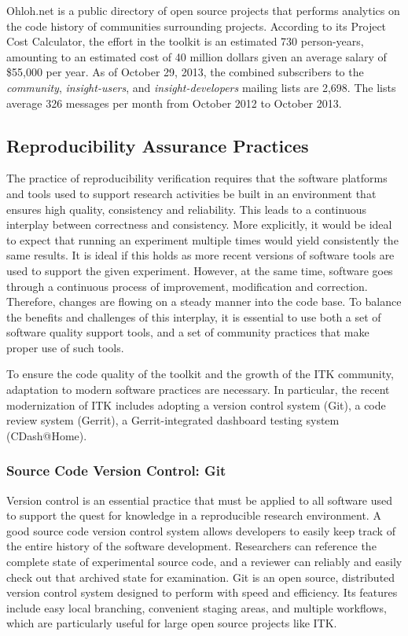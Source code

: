 \documentclass{frontiersENG} %
\begin{document}
Ohloh.net \cite{OhlohITK2013} is a public directory of open source projects
that performs analytics on the code history of communities surrounding
projects. According to its Project Cost Calculator, the effort in the toolkit
is an estimated 730 person-years, amounting to an estimated cost of 40 million
dollars given an average salary of \$55,000 per year.  As of October 29, 2013,
the combined subscribers to the \textit{community}, \textit{insight-users}, and
\textit{insight-developers} mailing lists are 2,698.  The lists average 326
messages per month from October 2012 to October 2013.


\subsection{Reproducibility Assurance Practices}
The practice of reproducibility verification requires that the software
platforms and tools used to support research activities be built in an
environment that ensures high quality, consistency and reliability. This
leads to a continuous interplay between correctness and consistency. More
explicitly, it would be ideal to expect that running an experiment multiple times
would yield consistently the same results. It is ideal if this holds as more
recent versions of software tools are used to support the given experiment.
However, at the same time, software goes through a continuous process of
improvement, modification and correction. Therefore, changes are flowing on a
steady manner into the code base. To balance the benefits and challenges of
this interplay, it is essential to use both a set of software quality support
tools, and a set of community practices that make proper use of such tools.

To ensure the code quality of the toolkit and the growth of the ITK community,
adaptation to modern software practices are necessary. In particular, the
recent modernization of ITK includes adopting a version control system (Git),
 a code review system (Gerrit), a Gerrit-integrated dashboard testing system
(CDash@Home).


\subsubsection{Source Code Version Control: Git}
Version control is an essential practice that must be applied to all software
used to support the quest for knowledge in a reproducible research environment.
A good source code version control system allows developers to easily keep
track of the entire history of the software development. Researchers can
reference the complete state of experimental source code, and a reviewer can
reliably and easily check out that archived state for examination.  Git is an
open source, distributed version control system designed to perform with speed
and efficiency. Its features include easy local branching, convenient staging
areas, and multiple workflows, which are particularly useful for large open
source projects like ITK.
\end{document}
